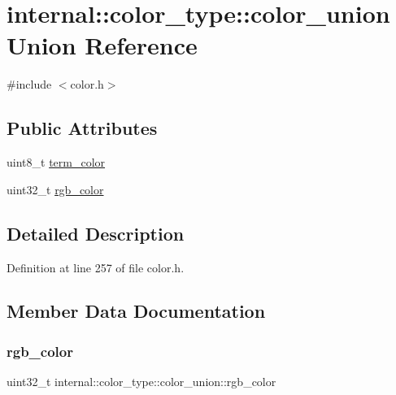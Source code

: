 \hypertarget{unioninternal_1_1color__type_1_1color__union}{}\section{internal\+:\+:color\+\_\+type\+:\+:color\+\_\+union Union Reference}
\label{unioninternal_1_1color__type_1_1color__union}


{\ttfamily \#include $<$color.\+h$>$}

\subsection*{Public Attributes}
\begin{DoxyCompactItemize}
\item 
uint8\+\_\+t \hyperlink{unioninternal_1_1color__type_1_1color__union_ac6843a3cb0050488db9fde54df345b82}{term\+\_\+color}
\item 
uint32\+\_\+t \hyperlink{unioninternal_1_1color__type_1_1color__union_a1c1fa5561b5f884349a6870150a449ae}{rgb\+\_\+color}
\end{DoxyCompactItemize}


\subsection{Detailed Description}


Definition at line 257 of file color.\+h.



\subsection{Member Data Documentation}
\mbox{\label{unioninternal_1_1color__type_1_1color__union_a1c1fa5561b5f884349a6870150a449ae}} 
\subsubsection{\texorpdfstring{rgb\+\_\+color}{rgb\_color}}
{\footnotesize\ttfamily uint32\+\_\+t internal\+::color\+\_\+type\+::color\+\_\+union\+::rgb\+\_\+color}




